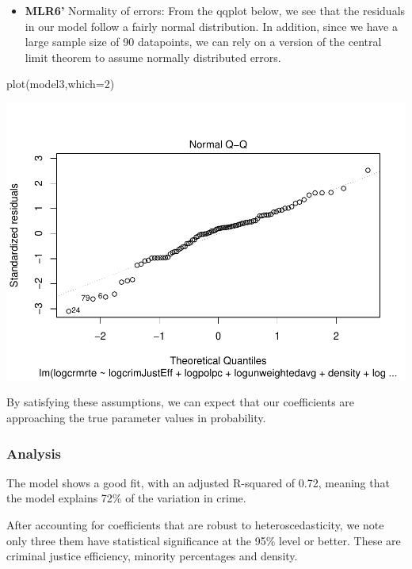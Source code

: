 \documentclass[]{article}
\newenvironment{Shaded}{}{}
\newcommand{\DataTypeTok}[1]{#1}
\newcommand{\DecValTok}[1]{#1}
\newcommand{\KeywordTok}[1]{\textcolor[rgb]{0.00,0.00,1.00}{#1}}
\newcommand{\NormalTok}[1]{#1}
\providecommand{\tightlist}{%
  \setlength{\itemsep}{0pt}\setlength{\parskip}{0pt}}
\begin{document}
\begin{itemize}
\tightlist
\item
  \textbf{MLR6'} Normality of errors: From the qqplot below, we see that
  the residuals in our model follow a fairly normal distribution. In
  addition, since we have a large sample size of 90 datapoints, we can
  rely on a version of the central limit theorem to assume normally
  distributed errors.
\end{itemize}

\begin{Shaded}
\begin{Highlighting}[]
\KeywordTok{plot}\NormalTok{(model3,}\DataTypeTok{which=}\DecValTok{2}\NormalTok{)}
\end{Highlighting}
\end{Shaded}

\includegraphics{Bagnard_Gaustad_Hartman_Leung_Lab_3_files/figure-latex/unnamed-chunk-101-1.pdf}

By satisfying these assumptions, we can expect that our coefficients are
approaching the true parameter values in probability.

\hypertarget{analysis}{%
\subsubsection{Analysis}\label{analysis}}

The model shows a good fit, with an adjusted R-squared of 0.72, meaning
that the model explains 72\% of the variation in crime.

After accounting for coefficients that are robust to heteroscedasticity,
we note only three them have statistical significance at the 95\% level
or better. These are criminal justice efficiency, minority percentages
and density.
\end{document}
